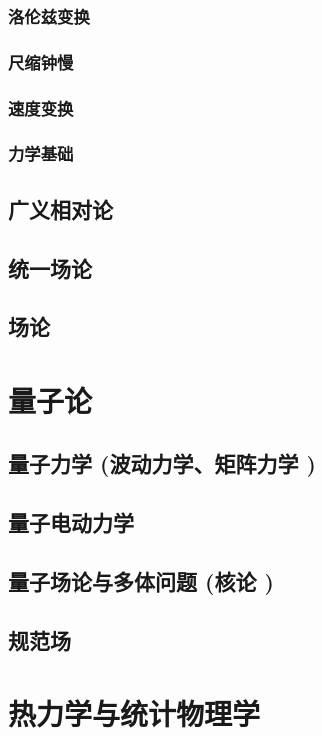 \documentclass[UTF8]{../06-Physics}
\begin{document}
\subsection{洛伦兹变换}



\subsection{尺缩钟慢}
\subsection{速度变换}
\subsection{力学基础}



\section{广义相对论}


\section{统一场论}
\section{场论}




\chapter{量子论} %
    \section{量子力学 (波动力学、矩阵力学 )}
    \section{量子电动力学}
    \section{量子场论与多体问题 (核论 )}
    \section{规范场}


\chapter{热力学与统计物理学} %
\end{document}
